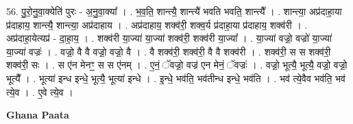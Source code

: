 \documentclass[17pt]{extarticle}
\begin{document}
56. पु॒रो॒नु॒वा॒क्येति॑ पुरः - अ॒नु॒वा॒क्या᳚ । . भ॒व॒ति॒ शान्त्यै॒ शान्त्यै॑ भवति भवति॒ शान्त्यै᳚ । . शान्त्या॒ अप्र॑दाहा॒या प्र॑दाहाय॒ शान्त्यै॒ शान्त्या॒ अप्र॑दाहाय । . अप्र॑दाहाय॒ शक्व॑री॒ शक्व॒र्य प्र॑दाहा॒या प्र॑दाहाय॒ शक्व॑री । . अप्र॑दाहा॒येत्यप्र॑ - दा॒हा॒य॒ । . शक्व॑री या॒ज्या॑ या॒ज्या॑ शक्व॑री॒ शक्व॑री या॒ज्या᳚ । . या॒ज्या॑ वज्रो॒ वज्रो॑ या॒ज्या॑ या॒ज्या॑ वज्रः॑ । . वज्रो॒ वै वै वज्रो॒ वज्रो॒ वै । . वै शक्व॑री॒ शक्व॑री॒ वै वै शक्व॑री । . शक्व॑री॒ स स शक्व॑री॒ शक्व॑री॒ सः । . स ए॑न मेनꣳ॒॒ स स ए॑नम् । . ए॒नं॒ ॅवज्रो॒ वज्र॑ एन मेनं॒ ॅवज्रः॑ । . वज्रो॒ भूत्यै॒ भूत्यै॒ वज्रो॒ वज्रो॒ भूत्यै᳚ । . भूत्या॑ इन्ध इन्धे॒ भूत्यै॒ भूत्या॑ इन्धे । . इ॒न्धे॒ भव॑ति॒ भव॑तीन्ध इन्धे॒ भव॑ति । . भव॑ त्ये॒वैव भव॑ति॒ भव॑ त्ये॒व । . ए॒वे त्ये॒व । \newline

\textbf{Ghana Paata } \newline
\end{document}
